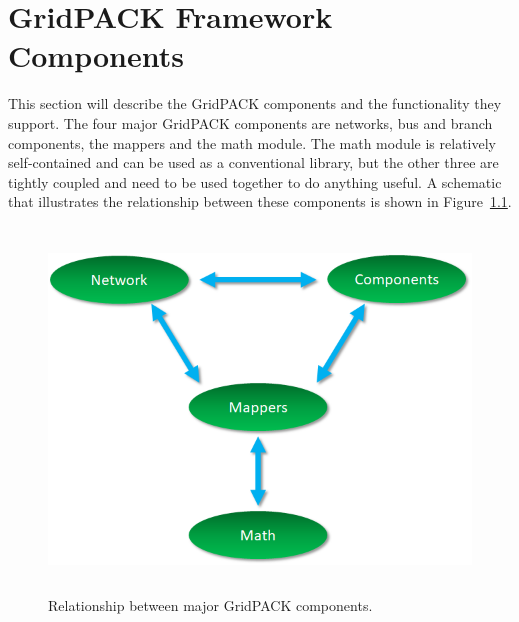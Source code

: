 \chapter{GridPACK Framework Components}

This section will describe the GridPACK components and the functionality they support. The four major GridPACK components are networks, bus and branch components, the mappers and the math module. The math module is relatively self-contained and can be used as a conventional library, but the other three are tightly coupled and need to be used together to do anything useful. A schematic that illustrates the relationship between these components is shown in Figure~\ref{fig:fig-1}.

\begin{figure}
  \centering
    \includegraphics*[width=6in, height=3.81in, keepaspectratio=true]{Fig1-Relationship-Grid-components}
  \caption{Relationship between major GridPACK components.}
  \label{fig:fig-1}
\end{figure}




